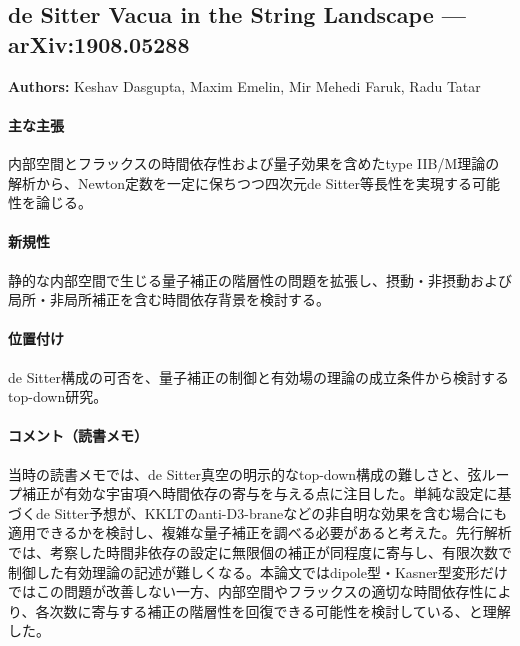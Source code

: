 \subsection{de Sitter Vacua in the String Landscape --- arXiv:1908.05288}

\textbf{Authors:} Keshav Dasgupta, Maxim Emelin, Mir Mehedi Faruk, Radu Tatar

\paragraph{主な主張}
内部空間とフラックスの時間依存性および量子効果を含めたtype IIB/M理論の解析から、Newton定数を一定に保ちつつ四次元de Sitter等長性を実現する可能性を論じる\cite{Dasgupta:2019gcd}。

\paragraph{新規性}
静的な内部空間で生じる量子補正の階層性の問題を拡張し、摂動・非摂動および局所・非局所補正を含む時間依存背景を検討する。

\paragraph{位置付け}
de Sitter構成の可否を、量子補正の制御と有効場の理論の成立条件から検討するtop-down研究。

\paragraph{コメント（読書メモ）}
当時の読書メモでは、de Sitter真空の明示的なtop-down構成の難しさと、弦ループ補正が有効な宇宙項へ時間依存の寄与を与える点に注目した。単純な設定に基づくde Sitter予想が、KKLTのanti-D3-braneなどの非自明な効果を含む場合にも適用できるかを検討し、複雑な量子補正を調べる必要があると考えた。先行解析\cite{Dasgupta:2018rtp}では、考察した時間非依存の設定に無限個の補正が同程度に寄与し、有限次数で制御した有効理論の記述が難しくなる。本論文ではdipole型・Kasner型変形だけではこの問題が改善しない一方、内部空間やフラックスの適切な時間依存性により、各次数に寄与する補正の階層性を回復できる可能性を検討している、と理解した。
